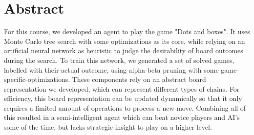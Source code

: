 \section*{Abstract}

For this course, we developed an agent to play the game "Dots and boxes". It uses Monte Carlo tree search with some optimizations as its core, while relying on an artificial neural network as heuristic to judge the desirability of board outcomes during the search. To train this network, we generated a set of solved games, labelled with their actual outcome, using alpha-beta pruning with some game-specific-optimizations. These components rely on an abstract board representation we developed, which can represent different types of chains. For efficiency, this board representation can be updated dynamically so that it only requires a limited amount of operations to process a new move. Combining all of this resulted in a semi-intelligent agent which can beat novice players and AI's some of the time, but lacks strategic insight to play on a higher level.